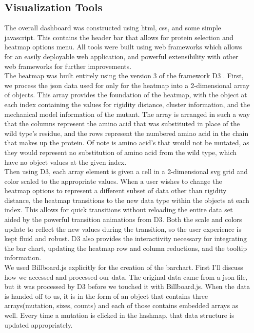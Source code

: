 \documentclass[11pt]{IEEEtran}
\begin{document}
\subsection{Visualization Tools}\label{AA}
The overall dashboard was constructed using html, css, and some simple javascript. This contains the header bar that allows for protein selection and heatmap options menu. All tools were built using web frameworks which allows for an easily deployable web application, and powerful extensibility with other web frameworks for further improvements.\\

The heatmap was built entirely using the version 3 of the framework D3 \cite{b7}. First, we process the json data used for only for the heatmap into a 2-dimensional array of objects. This array provides the foundation of the heatmap, with the object at each index containing the values for rigidity distance, cluster information, and the mechanical model information of the mutant. The array is arranged in such a way that the columns represent the amino acid that was substituted in place of the wild type's residue, and the rows represent the numbered amino acid in the chain that makes up the protein. Of note is amino acid's that would not be mutated, as they would represent no substitution of amino acid from the wild type, which have no object values at the given index.\\ 

Then using D3, each array element is given a cell in a 2-dimensional svg grid and color scaled to the appropriate values. When a user wishes to change the heatmap options to represent a different subset of data other than rigidity distance, the heatmap transitions to the new data type within the objects at each index. This allows for quick transitions without reloading the entire data set aided by the powerful transition animations from D3. Both the scale and colors update to reflect the new values during the transition, so the user experience is kept fluid and robust. D3 also provides the interactivity necessary for integrating the bar chart, updating the heatmap row and column reductions, and the tooltip information.\\

We used Billboard.js explicitly for the creation of the barchart. First I'll discuss how we accessed and processed our data. The original data came from a json file, but it was processed by D3 before we touched it with Billboard.js. When the data is handed off to us, it is in the form of an object that contains three arrays(mutation, sizes, counts) and each of those contains embedded arrays as well. Every time a mutation is clicked in the hashmap, that data structure is updated appropriately.\\
\end{document}
